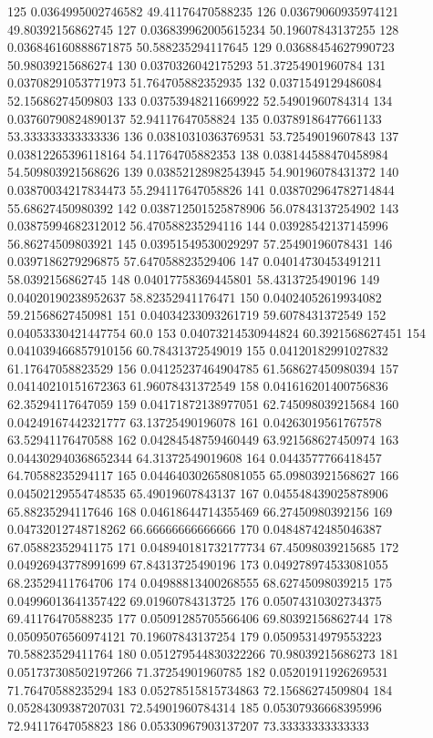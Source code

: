 {125 0.0364995002746582 49.41176470588235
126 0.03679060935974121 49.80392156862745
127 0.036839962005615234 50.19607843137255
128 0.036846160888671875 50.588235294117645
129 0.03688454627990723 50.98039215686274
130 0.0370326042175293 51.37254901960784
131 0.03708291053771973 51.764705882352935
132 0.0371549129486084 52.15686274509803
133 0.03753948211669922 52.54901960784314
134 0.03760790824890137 52.94117647058824
135 0.03789186477661133 53.333333333333336
136 0.03810310363769531 53.72549019607843
137 0.03812265396118164 54.11764705882353
138 0.038144588470458984 54.509803921568626
139 0.03852128982543945 54.90196078431372
140 0.03870034217834473 55.294117647058826
141 0.038702964782714844 55.68627450980392
142 0.038712501525878906 56.07843137254902
143 0.03875994682312012 56.470588235294116
144 0.03928542137145996 56.86274509803921
145 0.03951549530029297 57.25490196078431
146 0.0397186279296875 57.647058823529406
147 0.04014730453491211 58.0392156862745
148 0.04017758369445801 58.4313725490196
149 0.04020190238952637 58.82352941176471
150 0.04024052619934082 59.21568627450981
151 0.04034233093261719 59.6078431372549
152 0.04053330421447754 60.0
153 0.04073214530944824 60.3921568627451
154 0.041039466857910156 60.78431372549019
155 0.04120182991027832 61.17647058823529
156 0.04125237464904785 61.568627450980394
157 0.04140210151672363 61.96078431372549
158 0.041616201400756836 62.35294117647059
159 0.04171872138977051 62.745098039215684
160 0.04249167442321777 63.13725490196078
161 0.04263019561767578 63.52941176470588
162 0.04284548759460449 63.921568627450974
163 0.044302940368652344 64.31372549019608
164 0.0443577766418457 64.70588235294117
165 0.044640302658081055 65.09803921568627
166 0.04502129554748535 65.49019607843137
167 0.045548439025878906 65.88235294117646
168 0.04618644714355469 66.27450980392156
169 0.04732012748718262 66.66666666666666
170 0.04848742485046387 67.05882352941175
171 0.048940181732177734 67.45098039215685
172 0.04926943778991699 67.84313725490196
173 0.049278974533081055 68.23529411764706
174 0.04988813400268555 68.62745098039215
175 0.04996013641357422 69.01960784313725
176 0.05074310302734375 69.41176470588235
177 0.05091285705566406 69.80392156862744
178 0.05095076560974121 70.19607843137254
179 0.05095314979553223 70.58823529411764
180 0.051279544830322266 70.98039215686273
181 0.051737308502197266 71.37254901960785
182 0.05201911926269531 71.76470588235294
183 0.05278515815734863 72.15686274509804
184 0.05284309387207031 72.54901960784314
185 0.05307936668395996 72.94117647058823
186 0.05330967903137207 73.33333333333333
}

